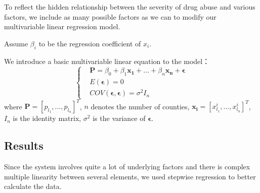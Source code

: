\documentclass{mcmthesis}
\begin{document}
  To reflect the hidden relationship between the severity of drug abuse and various factors, we include as many possible factors as we can to modify our multivariable linear regression model. \par

  Assume $\beta_i$ to be the regression coefficient of $x_i$. 

  We introduce a basic multivariable linear equation to the model：
    \begin{equation}
     \left\{ 
        \begin{array}{ll}
        &  \boldsymbol{P}  =  \beta_0 + \beta_1 \boldsymbol{x_1} + ... + \beta_n \boldsymbol{x_n} + \boldsymbol{\epsilon}  \\
        &  E(\boldsymbol{\epsilon})  =  0 \\
        & COV(\boldsymbol{\epsilon},\boldsymbol{\epsilon}) = \sigma ^2 I_n
        \end{array}
    \right. 
    \end{equation}
    where $\boldsymbol{P}=[p_{l_1},...,p_{l_n}]^{T}$, $n$ denotes the number of counties, $\boldsymbol{x_i}=[x_{l_1}^i,...,x_{l_n}^i]^{T}$,  $I_n$ is the identity matrix, $\sigma ^2$ is the variance of $\boldsymbol{\epsilon}$.

\subsection{Results}
  Since the system involves quite a lot of underlying factors and there is complex multiple linearity between several elements, we used stepwise regression to better calculate the data. 
\end{document}

